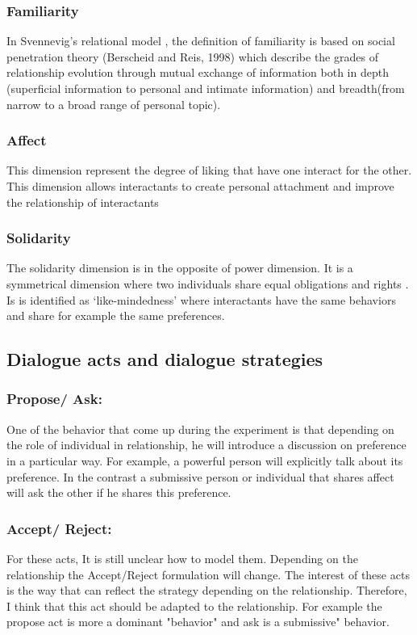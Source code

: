 \documentclass{llncs}
\begin{document}
\subsubsection{Familiarity}
In Svennevig’s relational model \cite{svennevig2000getting}, the definition of familiarity is based on social penetration theory (Berscheid and Reis, 1998) which describe the grades of relationship evolution through mutual exchange of information both in depth (superficial information to personal and intimate information) and breadth(from narrow to a broad range of personal topic).   
\subsubsection{Affect}
This dimension represent the degree of liking that have one interact for the other. This dimension allows interactants to create personal attachment and improve the relationship of interactants \cite{nicholson2001role}
\subsubsection{Solidarity}
The solidarity dimension is in the opposite of power dimension. It is a symmetrical dimension where two individuals share equal obligations and rights \cite{svennevig2000getting}. Is is identified as ‘like-mindedness’ \cite{bickmore2005establishing} where interactants have the same behaviors and share for example the same preferences.
\subsection{Dialogue acts and dialogue strategies}
 \subsubsection{Propose/ Ask:} One of the behavior that come up during the experiment is that depending on the role of individual in relationship, he will introduce a discussion on preference in a particular way. For example, a powerful person will explicitly 
talk about its preference. In the contrast a submissive person or individual that shares affect will ask the other if he shares this preference. 
\subsubsection{Accept/ Reject:} For these acts, It is still unclear how to model them. Depending on the relationship the Accept/Reject formulation will change. 
The interest of these acts is the way that can reflect the strategy depending on the relationship. Therefore, I think that this act should be adapted to the relationship. For example the propose act is more a dominant "behavior" and ask is a submissive" behavior. 

\noindent 
\vskip 4pt


\end{document}
